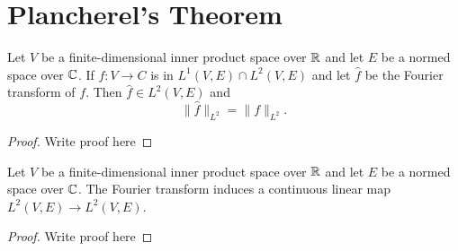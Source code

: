 \chapter{Plancherel's Theorem}
\label{chap:plancherel}


\begin{lemma}
  \label{lem:plancherel}
  \uses{}
  \leanok %
  Let $V$ be a finite-dimensional inner product space over $\mathbb{R}$ and let $E$ be a normed space over $\mathbb{C}$. If $f : V \to C$ is in $L^1(V,E)\cap L^2(V,E)$ and let $\widehat{f}$ be the Fourier transform of $f$. Then $\widehat{f}\in L^2(V,E)$ and
  \[\|\widehat{f}\|_{L^2} = \|f\|_{L^2}.\]
  \end{lemma}
    \begin{proof}
    Write proof here
\end{proof}

\begin{corollary}
  \label{lem:reparametrization}
  \leanok %
  Let $V$ be a finite-dimensional inner product space over $\mathbb{R}$ and let $E$ be a normed space over $\mathbb{C}$. The Fourier transform induces a continuous linear map $L^2(V,E) \to L^2(V,E)$.
  \end{corollary}
  \begin{proof}
    Write proof here
\end{proof}